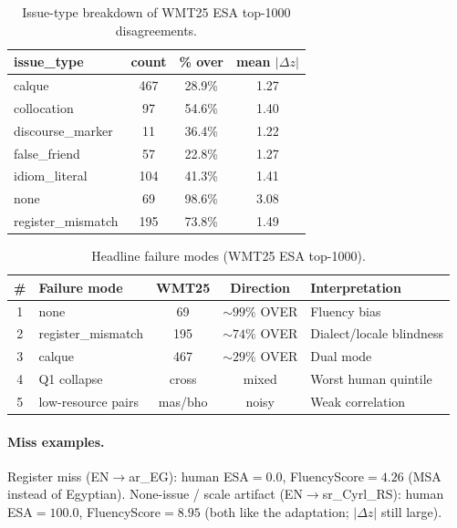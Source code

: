 \documentclass[11pt]{article}
\newcommand{\FS}{FluencyScore}
\begin{document}
\begin{table}[t]
\centering
\scriptsize
\caption{Issue-type breakdown of WMT25 ESA top-1000 disagreements.}
\label{tab:5a}
\begin{tabularx}{\columnwidth}{>{\raggedright\arraybackslash}Xccc}
\toprule
issue\_type & count & \% over & mean $|\Delta z|$ \\
\midrule
calque & 467 & 28.9\% & 1.27 \\
collocation & 97 & 54.6\% & 1.40 \\
discourse\_marker & 11 & 36.4\% & 1.22 \\
false\_friend & 57 & 22.8\% & 1.27 \\
idiom\_literal & 104 & 41.3\% & 1.41 \\
none & 69 & 98.6\% & 3.08 \\
register\_mismatch & 195 & 73.8\% & 1.49 \\
\bottomrule
\end{tabularx}

\end{table}

\begin{table}[t]
\centering
\scriptsize
\caption{Headline failure modes (WMT25 ESA top-1000).}
\label{tab:fail}
\begin{tabularx}{\columnwidth}{c>{\raggedright\arraybackslash}Xcc>{\raggedright\arraybackslash}X}
\toprule
\# & Failure mode & WMT25 & Direction & Interpretation \\
\midrule
1 & none & 69 & ${\sim}99\%$ OVER & Fluency bias \\
2 & register\_mismatch & 195 & ${\sim}74\%$ OVER & Dialect/locale blindness \\
3 & calque & 467 & ${\sim}29\%$ OVER & Dual mode \\
4 & Q1 collapse & cross & mixed & Worst human quintile \\
5 & low-resource pairs & mas/bho & noisy & Weak correlation \\
\bottomrule
\end{tabularx}

\end{table}


\paragraph{Miss examples.}
Register miss (EN$\to$ar\_EG): human ESA${=}0.0$, \FS${=}4.26$ (MSA instead of
Egyptian).
None-issue / scale artifact (EN$\to$sr\_Cyrl\allowbreak\_RS): human ESA${=}100.0$,
\FS${=}8.95$ (both like the adaptation; $|\Delta z|$ still large).
\end{document}
